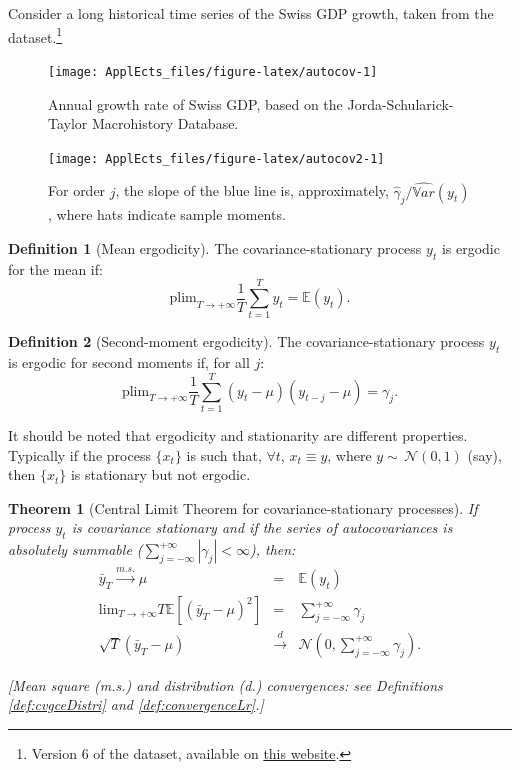 \documentclass[
  12pt,
]{book}
\newtheorem{theorem}{Theorem}[chapter]
\theoremstyle{definition}
\newtheorem{definition}{Definition}[chapter]
\theoremstyle{definition}
\theoremstyle{definition}
\theoremstyle{definition}
\theoremstyle{remark}
\begin{document}
Consider a long historical time series of the Swiss GDP growth, taken from the \citet{JST_2017} dataset.\footnote{Version 6 of the dataset, available on \href{https://www.macrohistory.net}{this website}.}

\begin{figure}
\texttt{[image: ApplEcts\_files/figure-latex/autocov-1]} \caption{Annual growth rate of Swiss GDP, based on the Jorda-Schularick-Taylor Macrohistory Database.}\label{fig:autocov}
\end{figure}

\begin{figure}
\texttt{[image: ApplEcts\_files/figure-latex/autocov2-1]} \caption{For order $j$, the slope of the blue line is, approximately, $\hat{\gamma}_j/\widehat{\mathbb{V}ar}(y_t)$, where hats indicate sample moments.}\label{fig:autocov2}
\end{figure}

\begin{definition}[Mean ergodicity]
\protect\hypertarget{def:ergodicity}{}\label{def:ergodicity}The covariance-stationary process \(y_t\) is ergodic for the mean if:
\[
\mbox{plim}_{T \rightarrow +\infty} \frac{1}{T}\sum_{t=1}^T y_t = \mathbb{E}(y_t).
\]
\end{definition}

\begin{definition}[Second-moment ergodicity]
\protect\hypertarget{def:ergod2nd}{}\label{def:ergod2nd}The covariance-stationary process \(y_t\) is ergodic for second moments if, for all \(j\):
\[
\mbox{plim}_{T \rightarrow +\infty} \frac{1}{T}\sum_{t=1}^T (y_t-\mu) (y_{t-j}-\mu) = \gamma_j.
\]
\end{definition}

It should be noted that ergodicity and stationarity are different properties. Typically if the process \(\{x_t\}\) is such that, \(\forall t\), \(x_t \equiv y\), where \(y \sim\,\mathcal{N}(0,1)\) (say), then \(\{x_t\}\) is stationary but not ergodic.

\begin{theorem}[Central Limit Theorem for covariance-stationary processes]
\protect\hypertarget{thm:CLTcovstat}{}\label{thm:CLTcovstat}If process \(y_t\) is covariance stationary and if the series of autocovariances is absolutely summable (\(\sum_{j=-\infty}^{+\infty} |\gamma_j| <\infty\)), then:
\begin{eqnarray}
\bar{y}_T \overset{m.s.}{\rightarrow} \mu &=& \mathbb{E}(y_t) \label{eq:TCL20}\\
\mbox{lim}_{T \rightarrow +\infty} T \mathbb{E}\left[(\bar{y}_T - \mu)^2\right] &=& \sum_{j=-\infty}^{+\infty} \gamma_j \label{eq:TCL2}\\
\sqrt{T}(\bar{y}_T - \mu) &\overset{d}{\rightarrow}& \mathcal{N}\left(0,\sum_{j=-\infty}^{+\infty} \gamma_j \right) \label{eq:TCL4ts}.
\end{eqnarray}

{[}Mean square (m.s.) and distribution (d.) convergences: see Definitions \ref{def:cvgceDistri} and \ref{def:convergenceLr}.{]}
\end{theorem}
\end{document}
